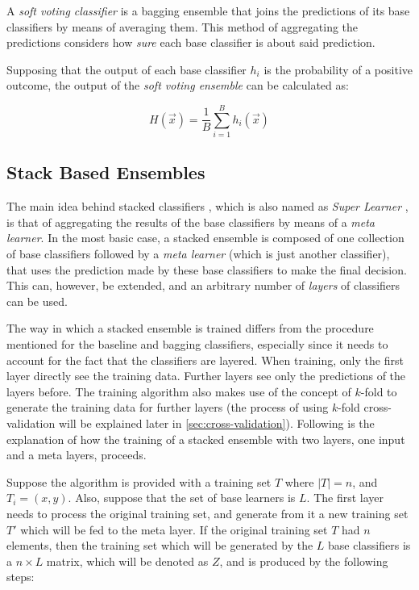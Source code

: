 \documentclass[epsfig,a4paper,11pt,titlepage,twoside,openany]{book}
\begin{document}
A \textit{soft voting classifier} is a bagging ensemble that joins the predictions of its base classifiers by means of averaging them. This method of aggregating the predictions considers how \textit{sure} each base classifier is about said prediction. 

Supposing that the output of each base classifier $h_i$ is the probability of a positive outcome, the output of the \textit{soft voting ensemble} can be calculated as:

\begin{equation*}
    H(\vec{x}) = \frac{1}{B} \sum_{i=1}^B h_i (\vec{x}) 
\end{equation*}


\subsection{Stack Based Ensembles}
\label{sec:stacked-ensembles}

The main idea behind stacked classifiers \cite{wolpert1992stacked,Breiman1996_stack}, which is also named as \textit{Super Learner} \cite{van2007super}, is that of aggregating the results of the base classifiers by means of a \textit{meta learner}. In the most basic case, a stacked ensemble is composed of one collection of base classifiers followed by a \textit{meta learner} (which is just another classifier), that uses the prediction made by these base classifiers to make the final decision. This can, however, be extended, and an arbitrary number of \textit{layers} of classifiers can be used.

The way in which a stacked ensemble is trained differs from the procedure mentioned for the baseline and bagging classifiers, especially since it needs to account for the fact that the classifiers are layered. When training, only the first layer directly see the training data. Further layers see only the predictions of the layers before. The training algorithm also makes use of the concept of $k$-fold to generate the training data for further layers (the process of using $k$-fold cross-validation will be explained later in \autoref{sec:cross-validation}). Following is the explanation of how the training of a stacked ensemble with two layers, one input and a meta layers, proceeds.

Suppose the algorithm is provided with a training set $T$ where $|T| = n$, and $T_i = (x, y)$. Also, suppose that the set of base learners is $L$. The first layer needs to process the original training set, and generate from it a new training set $T'$ which will be fed to the meta layer. If the original training set $T$ had $n$ elements, then the training set which will be generated by the $L$ base classifiers is a $n \times L$ matrix, which will be denoted as $Z$, and is produced by the following steps:
\end{document}
